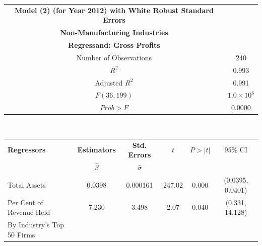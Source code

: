 \begin{table}[h]
\begin{tabular}{ c | c }
	\hline
	\textbf{Model (2) (for Year 2012) with White Robust Standard Errors} \\
    \textbf{Non-Manufacturing Industries} \\
    \textbf{Regressand: Gross Profits} \\
    \hline \hline
    Number of Observations & 240 \\
	\hline
    $R^{2}$ & 0.993 \\
    Adjusted $R^{2}$ & 0.991 \\
    \hline
    $F(36, 199)$ & $1.0 \times 10^{6}$ \\
    $Prob > F$ & 0.0000 \\
    \hline \hline
\end{tabular} \\

\begin{tabular}{ l | c | c | c | c | c }
	\hline
	\textbf{Regressors} & \textbf{Estimators} & \textbf{Std. Errors} & $t$ & $P > |t|$ & 95\% CI \\
    & $\hat{\beta}$ & $\hat{\sigma}$ & & & \\
    \hline \hline
	Total Assets & 0.0398 & 0.000161 & 247.02 & 0.000 & (0.0395, 0.0401) \\
	\hline
    Per Cent of Revenue Held & 7.230 & 3.498 & 2.07 & 0.040 & (0.331, 14.128) \\
    By Industry’s Top 50 Firms & & & & & \\
    \hline
    \hline \hline
\end{tabular}
\end{table}

